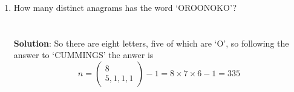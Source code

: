 \documentclass[11pt,a4paper]{scrartcl}
\begin{document}
\begin{enumerate}
\item How many distinct anagrams has the word `OROONOKO'?
  \\ \\ \\
  \textbf{Solution}: So there are eight letters, five of which are `O', so following the answer to `CUMMINGS' the anwer is
  \begin{equation}
    n=\left(\begin{array}{c}8\\5,1,1,1\end{array}\right)-1=8\times 7\times 6-1=335
  \end{equation}
  
\end{enumerate}
  
\end{document}
